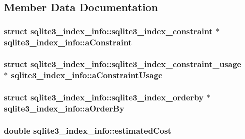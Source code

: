 \subsection{Member Data Documentation}
\hypertarget{structsqlite3__index__info_a634aa93834e2b47acf34454746c0f248}{
\subsubsection[{a\-Constraint}]{\setlength{\rightskip}{0pt plus 5cm}struct {\bf sqlite3\-\_\-index\-\_\-info\-::sqlite3\-\_\-index\-\_\-constraint} $\ast$ sqlite3\-\_\-index\-\_\-info\-::a\-Constraint}}\label{structsqlite3__index__info_a634aa93834e2b47acf34454746c0f248}
\hypertarget{structsqlite3__index__info_a79b8a969dd7d582fc2ea3c0fbc5adb56}{
\subsubsection[{a\-Constraint\-Usage}]{\setlength{\rightskip}{0pt plus 5cm}struct {\bf sqlite3\-\_\-index\-\_\-info\-::sqlite3\-\_\-index\-\_\-constraint\-\_\-usage} $\ast$ sqlite3\-\_\-index\-\_\-info\-::a\-Constraint\-Usage}}\label{structsqlite3__index__info_a79b8a969dd7d582fc2ea3c0fbc5adb56}
\hypertarget{structsqlite3__index__info_a6823a68979e19d8e332389361e920ef9}{
\subsubsection[{a\-Order\-By}]{\setlength{\rightskip}{0pt plus 5cm}struct {\bf sqlite3\-\_\-index\-\_\-info\-::sqlite3\-\_\-index\-\_\-orderby} $\ast$ sqlite3\-\_\-index\-\_\-info\-::a\-Order\-By}}\label{structsqlite3__index__info_a6823a68979e19d8e332389361e920ef9}
\hypertarget{structsqlite3__index__info_aa8b4fe1d2ee38aab57ba5e1da00d7830}{
\subsubsection[{estimated\-Cost}]{\setlength{\rightskip}{0pt plus 5cm}double sqlite3\-\_\-index\-\_\-info\-::estimated\-Cost}}\label{structsqlite3__index__info_aa8b4fe1d2ee38aab57ba5e1da00d7830}
